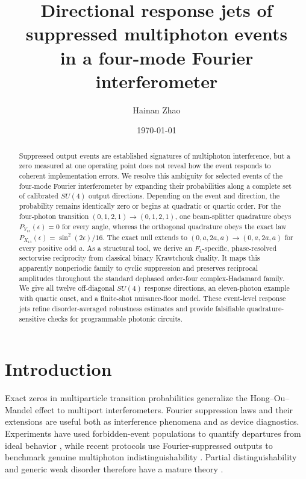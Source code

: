 \documentclass[aps,pra,reprint,amsmath,amssymb,superscriptaddress,longbibliography]{revtex4-2}
\begin{document}
\title{Directional response jets of suppressed multiphoton events\\
in a four-mode Fourier interferometer}

\author{Hainan Zhao}

\date{\today}

\begin{abstract}
Suppressed output events are established signatures of multiphoton
interference, but a zero measured at one operating point does not reveal how
the event responds to coherent implementation errors.  We resolve this
ambiguity for selected events of the four-mode Fourier interferometer by
expanding their probabilities along a complete set of calibrated
$SU(4)$ output directions.  Depending on the event and direction, the
probability remains identically zero or begins at quadratic or quartic order.
For the four-photon transition
$(0,1,2,1)\rightarrow(0,1,2,1)$, one beam-splitter quadrature obeys
$P_{Y_{13}}(\epsilon)=0$ for every angle, whereas the orthogonal quadrature
obeys the exact law
$P_{X_{13}}(\epsilon)=\sin^2(2\epsilon)/16$.
The exact null extends to
$(0,a,2a,a)\rightarrow(0,a,2a,a)$ for every positive odd $a$.
As a structural tool, we derive an $F_4$-specific, phase-resolved sectorwise
reciprocity from classical binary Krawtchouk duality.  It maps this apparently
nonperiodic family to cyclic suppression and preserves reciprocal amplitudes
throughout the standard dephased order-four complex-Hadamard family.
We give all twelve off-diagonal $SU(4)$ response directions, an
eleven-photon example with quartic onset, and a finite-shot nuisance-floor
model.  These event-level response jets refine disorder-averaged robustness
estimates and provide falsifiable quadrature-sensitive checks for programmable
photonic circuits.
\end{abstract}

\maketitle

\section{Introduction}

Exact zeros in multiparticle transition probabilities generalize the
Hong--Ou--Mandel effect to multiport interferometers.  Fourier suppression
laws \cite{Tichy2010,Crespi2016,Dittel2018PRL,Dittel2018PRA} and their
extensions \cite{Bezerra2023} are useful both as interference phenomena and as
device diagnostics.  Experiments have used forbidden-event populations to
quantify departures from ideal behavior
\cite{Crespi2016,Wang2023}, while recent protocols use Fourier-suppressed
outputs to benchmark genuine multiphoton indistinguishability
\cite{Sanz2026}.  Partial distinguishability and generic weak disorder
therefore have a mature theory
\cite{Shchesnovich2015,Dittel2018PRL}.
\end{document}
